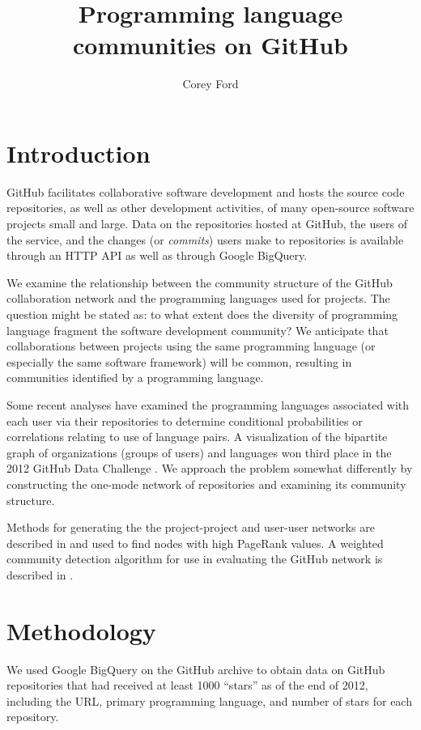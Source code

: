 \documentclass[twocolumn]{article}
\title{Programming language communities on GitHub}
\author{Corey Ford}
\begin{document}
\maketitle

\section{Introduction}

GitHub \cite{github} facilitates collaborative software development and hosts
the source code repositories, as well as other development activities, of many
open-source software projects small and large. Data on the repositories hosted
at GitHub, the users of the service, and the changes (or \textit{commits}) users
make to repositories is available through an HTTP API as well as through Google
BigQuery.

We examine the relationship between the community structure of the GitHub
collaboration network and the programming languages used for projects. The
question might be stated as: to what extent does the diversity of programming
language fragment the software development community? We anticipate that
collaborations between projects using the same programming language (or
especially the same software framework) will be common, resulting in communities
identified by a programming language.

Some recent analyses have examined the programming languages associated with each
user via their repositories to determine conditional probabilities \cite{doll12}
or correlations \cite{shah13} relating to use of language pairs. A visualization
of the bipartite graph of organizations (groups of users) and languages
\cite{rodrigues12} won third place in the 2012 GitHub Data Challenge . We
approach the problem somewhat differently by constructing the one-mode network
of repositories and examining its community structure.

Methods for generating the the project-project and user-user networks are
described in \cite{thung2013} and used to find nodes with high PageRank values.
A weighted community detection algorithm for use in evaluating the GitHub
network is described in \cite{marrama}.

\section{Methodology}
We used Google BigQuery on the GitHub archive to obtain data on GitHub
repositories that had received at least 1000 ``stars'' as of the end of 2012,
including the URL, primary programming language, and number of stars for each
repository.
\end{document}
